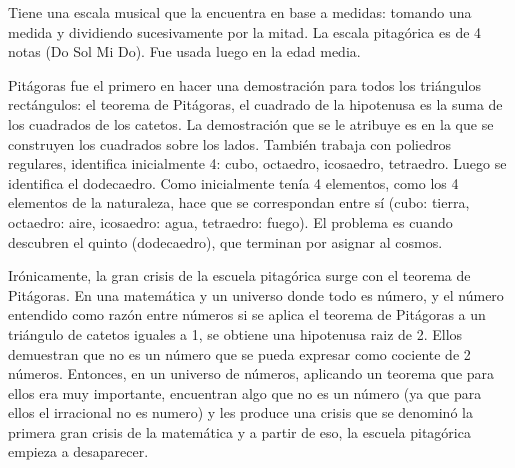 Tiene una escala musical que la encuentra en base a medidas: tomando una medida y dividiendo sucesivamente por la mitad. La escala pitagórica es de 4 notas (Do Sol Mi Do). Fue usada luego en la edad media.

Pitágoras fue el primero en hacer una demostración para todos los triángulos rectángulos: el teorema de Pitágoras, el cuadrado de la hipotenusa es la suma de los cuadrados de los catetos. La demostración que se le atribuye es en la que se construyen los cuadrados sobre los lados. También trabaja con poliedros regulares, identifica inicialmente 4: cubo, octaedro, icosaedro, tetraedro. Luego se identifica el dodecaedro. Como inicialmente tenía 4 elementos, como los 4 elementos de la naturaleza, hace que se correspondan entre sí (cubo: tierra, octaedro: aire,  icosaedro: agua, tetraedro: fuego). El problema es cuando descubren el quinto (dodecaedro), que terminan por asignar al cosmos.

Irónicamente, la gran crisis de la escuela pitagórica surge con el teorema de Pitágoras. En una matemática y un universo donde todo es número, y el número entendido como razón entre números si se aplica el teorema de Pitágoras a un triángulo de catetos iguales a 1, se obtiene una hipotenusa raiz de 2. Ellos demuestran que no es un número que se pueda expresar como cociente de 2 números. Entonces, en un universo de números, aplicando un teorema que para ellos era muy importante, encuentran algo que no es un número (ya que para ellos el irracional no es numero) y les produce una crisis que se denominó la primera gran crisis de la matemática y a partir de eso, la escuela pitagórica empieza a desaparecer.